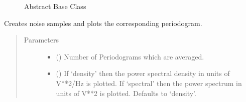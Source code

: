 \documentclass[letterpaper,10pt,english]{sphinxmanual}
\begin{document}
\begin{fulllineitems}

\begin{description}
\item[{}] \leavevmode
Abstract Base Class

\end{description}



\begin{fulllineitems}
\label{\detokenize{qsim:qsim.noise.NTGColoredNoise.plot_periodogram}}
Creates noise samples and plots the corresponding periodogram.
\begin{quote}\begin{description}
\item[{Parameters}] \leavevmode\begin{itemize}
\item {} 
 () \textendash{} Number of Periodograms which are averaged.

\item {} 
 (\sphinxstyleliteralemphasis{\sphinxupquote{, }}\sphinxstyleliteralemphasis{\sphinxupquote{, }}) \textendash{} If ‘density’ then the power spectral density in units of V**2/Hz is
plotted.
If ‘spectral’ then the power spectrum in units of V**2 is plotted.
Defaults to ‘density’.


\end{itemize}
\end{description}
\end{quote}
\end{fulllineitems}
\end{fulllineitems}
\end{document}

